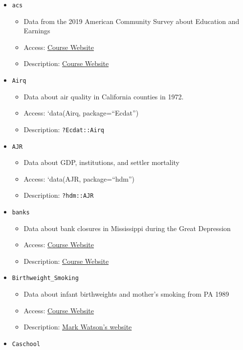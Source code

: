 \documentclass[
  letterpaper,
  DIV=11,
  numbers=noendperiod]{scrreprt}
\begin{document}
\begin{itemize}
\item
  \texttt{acs}

  \begin{itemize}
  \item
    Data from the 2019 American Community Survey about Education and
    Earnings
  \item
    Access:
    \href{http://bcallaway11.github.io/Courses/ECON_4750_Fall_2023/}{Course
    Website}
  \item
    Description:
    \href{http://bcallaway11.github.io/Courses/ECON_4750_Fall_2023/}{Course
    Website}
  \end{itemize}
\item
  \texttt{Airq}

  \begin{itemize}
  \item
    Data about air quality in California counties in 1972.
  \item
    Access: `data(Airq, package=``Ecdat'')
  \item
    Description: \texttt{?Ecdat::Airq}
  \end{itemize}
\item
  \texttt{AJR}

  \begin{itemize}
  \item
    Data about GDP, institutions, and settler mortality
  \item
    Access: `data(AJR, package=``hdm'')
  \item
    Description: \texttt{?hdm::AJR}
  \end{itemize}
\item
  \texttt{banks}

  \begin{itemize}
  \item
    Data about bank closures in Mississippi during the Great Depression
  \item
    Access:
    \href{http://bcallaway11.github.io/Courses/ECON_4750_Fall_2023/}{Course
    Website}
  \item
    Description:
    \href{http://bcallaway11.github.io/Courses/ECON_4750_Fall_2023/}{Course
    Website}
  \end{itemize}
\item
  \texttt{Birthweight\_Smoking}

  \begin{itemize}
  \item
    Data about infant birthweights and mother's smoking from PA 1989
  \item
    Access:
    \href{http://bcallaway11.github.io/Courses/ECON_4750_Fall_2023/}{Course
    Website}
  \item
    Description:
    \href{https://www.princeton.edu/~mwatson/Stock-Watson_3u/Students/EE_Datasets/Birthweight_Smoking_Description.pdf}{Mark
    Watson's website}
  \end{itemize}
\item
  \texttt{Caschool}


\end{itemize}
\end{document}
